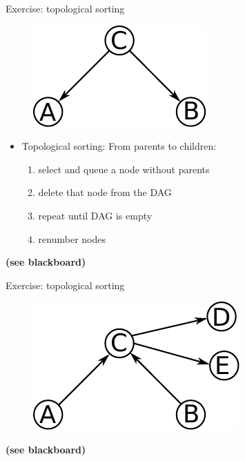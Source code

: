 \begin{frame}

Exercise: topological sorting

\begin{figure}[h]
	\centering
	\includegraphics[width=0.3\linewidth]{img/cond}%
    \label{fig:cond}%
\end{figure}

	\begin{itemize}
		\item Topological sorting: From parents to children:
			\begin{enumerate}
				\item select and queue a node without parents
				\item delete that node from the DAG
				\item repeat until DAG is empty
				\item renumber nodes
			\end{enumerate}
	\end{itemize}


\textbf{(see blackboard)}


\end{frame}


\begin{frame}

Exercise: topological sorting

\begin{figure}[h]
	\centering
	\includegraphics[width=0.3\linewidth]{img/dag1}%
    \label{fig:cond}%
\end{figure}

\textbf{(see blackboard)}


\end{frame}


